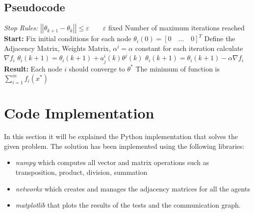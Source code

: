 \documentclass[a4paper,11pt,oneside]{book}
\begin{document}
\subsection {Pseudocode} \label{Subsec1.1.3}
\begin{algorithm}
\caption{}
\begin{algorithmic} [1]
\State \textit{Stop Rules:}
\State $\left|\left|\theta_{k+1} - \theta_k\right|\right|  \leq \varepsilon \qquad \varepsilon$ fixed
\State Number of maximum iterations reached
\State \textbf{Start:}
\State Fix initial conditions for each node $\theta_i(0) = [0 \quad ... \quad 0]^T$
\State Define the Adjacency Matrix, Weights Matrix, $\alpha^i = \alpha$ constant for each iteration
    \State calculate $\nabla f_i$
        \State $\theta_i(k+1) = \theta_i(k+1) + a^i_j(k) \theta^j(k)$
    \EndFor
    \State $\theta_i(k+1) = \theta_i(k+1) - \alpha \nabla f_i$
\EndWhile
\State \textbf{Result:}
\State Each node $i$ should converge to $\theta^*$
\State The minimum of function is $\sum \limits_{i=1}^{m}f_i(x^*)$
\end{algorithmic}
\end{algorithm}


\section {Code Implementation} \label{Sec1.2}

In this section it will be explained the Python implementation that solves the given problem. The solution has been implemented using the following libraries:
\begin{itemize}
	\item  \textit{numpy} which computes all vector and matrix operations such as transposition, product, division,
	summation
	\item \textit{networkx} which creates and manages the adjacency matrices for all the agents
	\item \textit{matplotlib} that plots the results
	of the tests and the communication graph.
\end{itemize}
\end{document}
